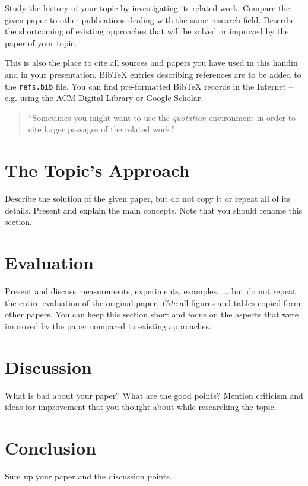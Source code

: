 \documentclass[a4paper,10pt,twoside]{article}
\begin{document}
Study the history of your topic by investigating its related work.
Compare the given paper to other publications dealing with the same research field.
Describe the shortcoming of existing approaches that will be solved or improved by the paper of your topic.

This is also the place to cite all sources and papers you have used in this handin and in your presentation. 
Bib\TeX$\!$ entries describing references are to be added to the \verb|refs.bib| file. 
You can find pre-formatted Bib\TeX$\!$ records in the Internet -- e.g. using the ACM Digital Library or Google Scholar.

\begin{quotation}
	``Sometimes you might want to use the \emph{quotation} environment in order to cite larger passages of the related work.''
\end{quotation}

\section{The Topic's Approach}

Describe the solution of the given paper, but do not copy it or repeat all of its details.
Present and explain the main concepts. 
Note that you should rename this section. 

\section{Evaluation}

Present and discuss measurements, experiments, examples, ... but do not repeat the entire evaluation of the original paper.
\emph{Cite} all figures and tables copied form other papers.
You can keep this section short and focus on the aspects that were improved by the paper compared to existing approaches.

\section{Discussion}

What is bad about your paper? 
What are the good points? 
Mention criticism and ideas for improvement that you thought about while researching the topic.

\section{Conclusion}

Sum up your paper and the discussion points.


 
\end{document}
